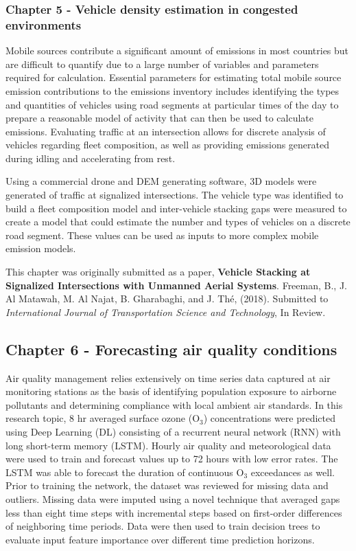 \subsubsection*{Chapter 5 - Vehicle density estimation in congested environments}

Mobile sources contribute a significant amount of emissions in most countries but are difficult to quantify due to a large number of variables and parameters required for calculation. Essential parameters for estimating total mobile source emission contributions to the emissions inventory includes identifying the types and quantities of vehicles using road segments at particular times of the day to prepare a reasonable model of activity that can then be used to calculate emissions. Evaluating traffic at an intersection allows for discrete analysis of vehicles regarding fleet composition, as well as providing emissions generated during idling and accelerating from rest.

Using a commercial drone and DEM generating software, 3D models were generated of traffic at signalized intersections. The vehicle type was identified to build a fleet composition model and inter-vehicle stacking gaps were measured to create a model that could estimate the number and types of vehicles on a discrete road segment. These values can be used as inputs to more complex mobile emission models.

This chapter was originally submitted as a paper, \textbf{Vehicle Stacking at Signalized Intersections with Unmanned Aerial Systems}.  Freeman,  B., J. Al Matawah, M. Al Najat, B. Gharabaghi, and J.  Th\'e, (2018). Submitted to \textit{International Journal of Transportation Science and Technology}, In Review.

\subsection*{Chapter 6 - Forecasting air quality conditions}

Air quality management relies extensively on time series data captured at air monitoring stations as the basis of identifying population exposure to airborne pollutants and determining compliance with local ambient air standards. In this research topic, 8 hr averaged surface ozone (O$_{3}$) concentrations were predicted using Deep Learning (DL) consisting of a recurrent neural network (RNN) with long short-term memory (LSTM). Hourly air quality and meteorological data were used to train and forecast values up to 72 hours with low error rates. The LSTM was able to forecast the duration of continuous O$_{3}$ exceedances as well. Prior to training the network, the dataset was reviewed for missing data and outliers. Missing data were imputed using a novel technique that averaged gaps less than eight time steps with incremental steps based on first-order differences of neighboring time periods. Data were then used to train decision trees to evaluate input feature importance over different time prediction horizons. 

